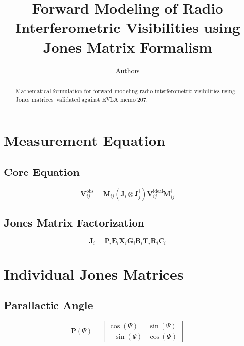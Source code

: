 \documentclass{aastex631}
\begin{document}
\title{Forward Modeling of Radio Interferometric Visibilities using Jones Matrix Formalism}

\author{Authors}

\begin{abstract}
Mathematical formulation for forward modeling radio interferometric visibilities using Jones matrices, validated against EVLA memo 207.
\end{abstract}


\section{Measurement Equation}

\subsection{Core Equation}
\begin{equation}
\mathbf{V}_{ij}^{\mathrm{obs}} = \mathbf{M}_{ij} \left( \mathbf{J}_i \otimes \mathbf{J}_j^{\dagger} \right) \mathbf{V}_{ij}^{\mathrm{ideal}} \mathbf{M}_{ij}^{\dagger}
\end{equation}

\subsection{Jones Matrix Factorization}
\begin{equation}
\mathbf{J}_i = \mathbf{P}_i \mathbf{E}_i \mathbf{X}_i \mathbf{G}_i \mathbf{B}_i \mathbf{T}_i \mathbf{R}_i \mathbf{C}_i
\end{equation}

\section{Individual Jones Matrices}

\subsection{Parallactic Angle}
\begin{equation}
\mathbf{P}(\Psi) = \begin{bmatrix} 
\cos(\Psi) & \sin(\Psi) \\ 
-\sin(\Psi) & \cos(\Psi) 
\end{bmatrix}
\end{equation}
\end{document}
